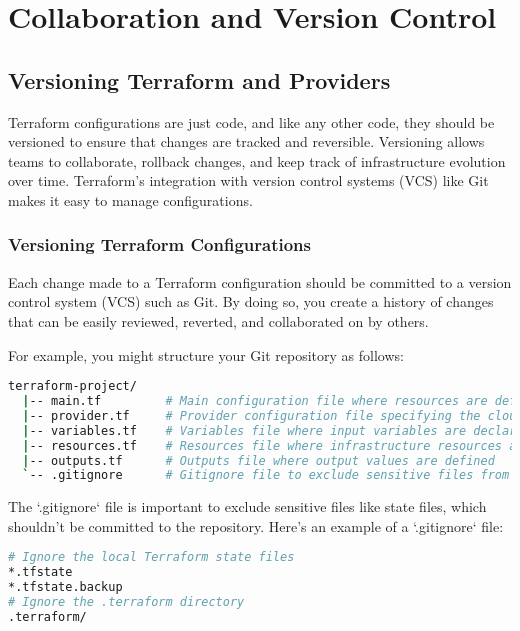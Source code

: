 \chapter{Collaboration and Version Control}
\sloppy

\section{Versioning Terraform and Providers}

Terraform configurations are just code, and like any other code, they should be versioned to ensure that changes are tracked and reversible. Versioning allows teams to collaborate, rollback changes, and keep track of infrastructure evolution over time. Terraform's integration with version control systems (VCS) like Git makes it easy to manage configurations.

\subsection{Versioning Terraform Configurations}

Each change made to a Terraform configuration should be committed to a version control system (VCS) such as Git. By doing so, you create a history of changes that can be easily reviewed, reverted, and collaborated on by others.

For example, you might structure your Git repository as follows:

\begin{lstlisting}[language=bash]
  terraform-project/
  |-- main.tf         # Main configuration file where resources are defined
  |-- provider.tf     # Provider configuration file specifying the cloud provider details
  |-- variables.tf    # Variables file where input variables are declared
  |-- resources.tf    # Resources file where infrastructure resources are defined
  |-- outputs.tf      # Outputs file where output values are defined
  `-- .gitignore      # Gitignore file to exclude sensitive files from version control
\end{lstlisting}

The `.gitignore` file is important to exclude sensitive files like state files, which shouldn't be committed to the repository. Here's an example of a `.gitignore` file:

\begin{lstlisting}[language=bash]
# Ignore the local Terraform state files
*.tfstate
*.tfstate.backup
# Ignore the .terraform directory
.terraform/
\end{lstlisting}


